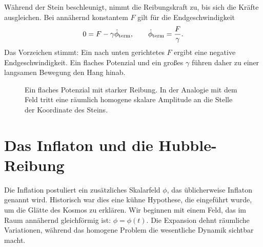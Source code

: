 \begin{classroomqa}
\end{classroomqa}

Während der Stein beschleunigt, nimmt die Reibungskraft zu, bis sich die Kräfte ausgleichen. Bei annähernd konstantem \(F\) gilt für die Endgeschwindigkeit
\begin{equation}
0=F-\gamma\dot\phi_{\rm term},
\qquad
\dot\phi_{\rm term}=\frac{F}{\gamma}.
\end{equation}
Das Vorzeichen stimmt: Ein nach unten gerichtetes \(F\) ergibt eine negative Endgeschwindigkeit. Ein flaches Potenzial und ein großes \(\gamma\) führen daher zu einer langsamen Bewegung den Hang hinab.

\begin{figure}[htbp]
\centering
{}
\caption{Ein flaches Potenzial mit starker Reibung. In der Analogie mit dem Feld tritt eine räumlich homogene skalare Amplitude an die Stelle der Koordinate des Steins.}
\label{fig:c08-shallow-potential}
\end{figure}

\section{Das Inflaton und die Hubble-Reibung}

Die Inflation postuliert ein zusätzliches Skalarfeld \(\phi\), das üblicherweise Inflaton genannt wird. Historisch war dies eine kühne Hypothese, die eingeführt wurde, um die Glätte des Kosmos zu erklären. Wir beginnen mit einem Feld, das im Raum annähernd gleichförmig ist: \(\phi=\phi(t)\). Die Expansion dehnt räumliche Variationen, während das homogene Problem die wesentliche Dynamik sichtbar macht.

